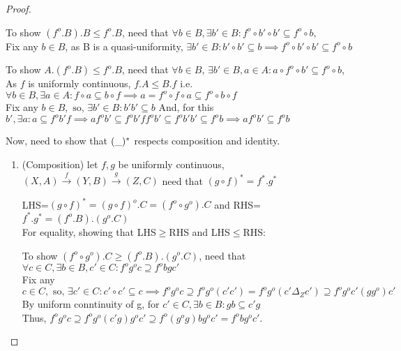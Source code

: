 \documentclass[18pt,a4paper]{article}
\theoremstyle{definition}
\begin{document}
\begin{proof}
\begin{enumerate}[label=(\roman*)]
			\end{enumerate}
		\item	To show $(f^o .B).B \leq f^o .B$, need that $\forall b \in B,
			\exists b' \in B : f^o \circ b' \circ b' \subseteq f^o \circ b$,\\
			Fix any $b \in B$, as B is a quasi-uniformity, $\exists b' \in B : b' \circ b' \subseteq b
			\implies f^o \circ b'\circ b' \subseteq f^o \circ b$

			To show $A.(f^o .B) \leq f^o .B$, need that $\forall b \in B$,
			$\exists b' \in B, a\in A : a \circ f^o \circ b' \subseteq f^o \circ b$,\\
			As $f$ is uniformly continuous, $f.A\leq B.f$ i.e. $\forall b \in B, \exists a \in A
			: f \circ a \subseteq b \circ f
			\implies a= f^o \circ f \circ a \subseteq f^o \circ  b \circ f $   \\
			Fix any $b \in B, \text{ so, } \exists b' \in B : b'b' \subseteq b$
			And, for this $b', \exists a : a \subseteq f^ob'f \implies af^ob' \subseteq f^ob'ff^ob'
			\subseteq f^o b'b' \subseteq f^o b \implies af^ob' \subseteq f^o b$\\
		\item	Now, need to show that $(\string _)^*$ respects composition and identity.
			\begin{enumerate}[label=(\roman*)]
				\item (Composition) let $f,g$ be uniformly continuous,
					$(X,A) \xrightarrow{f} (Y,B) \xrightarrow{g} (Z,C)$
					need that $(g \circ f)^*= f^*.g^* $

					LHS=$(g \circ f)^*=(g \circ f)^o .C=(f^o \circ g^o).C$ and
					RHS=$f^*.g^* =(f^o .B).(g^o .C)$\\
					For equality, showing that LHS$\geq$RHS and LHS$\leq$RHS:

					To show $(f^o \circ g^o).C\geq(f^o .B).(g^o .C)$, need that
					$\forall c \in C, \exists b \in B, c' \in C : f^og^oc
					\supseteq f^obgc'$ \\
					Fix any $c \in C, \text{ so, } \exists c' \in C: c' \circ c' \subseteq c
					\implies f^o g^o c \supseteq f^o g^o (c'c')
					=f^o g^o (c' \Delta_Z c') \supseteq f^o g^o c'(gg^o)c'$ \\
					By uniform conntinuity of g, for $c'\in C,\exists b\in B: gb\subseteq c'g $
					\\Thus, $f^o g^o c \supseteq f^o g^o (c'g)g^oc' \supseteq
					f^o (g^o g)bg^o c'=f^o bg^o c'$.


\end{enumerate}
\end{proof}
\end{document}
